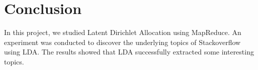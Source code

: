 \documentclass[conference]{IEEEtran}
\begin{document}
%





\section{Conclusion}
In this project, we studied Latent Dirichlet Allocation using MapReduce. An experiment was conducted to discover the underlying topics of Stackoverflow using LDA. The results showed that LDA successfully extracted some interesting topics.










\end{document}
